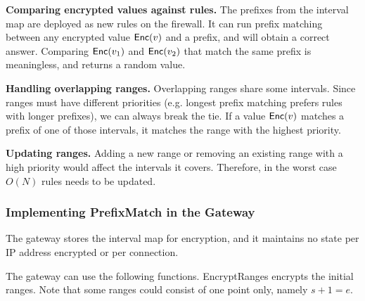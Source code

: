 
\noindent \textbf{Comparing encrypted values against rules.}
The prefixes from the interval map are deployed as new rules on the firewall. It can run prefix matching between any encrypted value $\mathsf{Enc}(v)$ and a prefix, and will obtain a correct answer. Comparing $\mathsf{Enc}(v_1)$ and $\mathsf{Enc}(v_2)$ that match the same prefix is meaningless, and returns a random value.

\noindent \textbf{Handling overlapping ranges.} 
Overlapping ranges share some intervals. Since ranges must have different priorities (e.g. longest prefix matching prefers rules with longer prefixes), we can always break the tie. If a value $\mathsf{Enc}(v)$ matches a prefix of one of those intervals, it matches the range with the highest priority.

\noindent \textbf{Updating ranges.}
Adding a new range or removing an existing range with a high priority would affect the intervals it covers. Therefore, in the worst case $O(N)$ rules needs to be updated. 

\subsubsection{Implementing PrefixMatch in the Gateway}
\label{sec:tree}

The gateway stores the interval map for encryption, and it maintains no state per IP address encrypted or per connection.

The gateway can use the following functions. EncryptRanges encrypts the initial ranges. Note that some ranges could consist of
one point only, namely $s + 1 = e$. 


